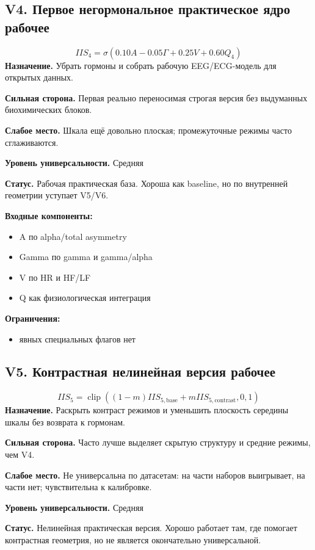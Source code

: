 \documentclass[11pt,a4paper]{article}
\begin{document}
\subsection*{V4. Первое негормональное практическое ядро \textcolor{green!20!black}{\textbf{рабочее}}}
\[
IIS_4=\sigma(0.10A-0.05\Gamma+0.25V+0.60Q_4)
\]
\textbf{Назначение.} Убрать гормоны и собрать рабочую EEG/ECG-модель для открытых данных.

\textbf{Сильная сторона.} Первая реально переносимая строгая версия без выдуманных биохимических блоков.

\textbf{Слабое место.} Шкала ещё довольно плоская; промежуточные режимы часто сглаживаются.

\textbf{Уровень универсальности.} Средняя

\textbf{Статус.} Рабочая практическая база. Хороша как baseline, но по внутренней геометрии уступает V5/V6.

\textbf{Входные компоненты:}
\begin{itemize}[leftmargin=1.2cm]
\item A по alpha/total asymmetry
\item Gamma по gamma и gamma/alpha
\item V по HR и HF/LF
\item Q как физиологическая интеграция
\end{itemize}

\textbf{Ограничения:}
\begin{itemize}[leftmargin=1.2cm]
\item явных специальных флагов нет
\end{itemize}


\subsection*{V5. Контрастная нелинейная версия \textcolor{green!20!black}{\textbf{рабочее}}}
\[
IIS_5=\operatorname{clip}\!\left((1-m)IIS_{5,\mathrm{base}}+mIIS_{5,\mathrm{contrast}},0,1\right)
\]
\textbf{Назначение.} Раскрыть контраст режимов и уменьшить плоскость середины шкалы без возврата к гормонам.

\textbf{Сильная сторона.} Часто лучше выделяет скрытую структуру и средние режимы, чем V4.

\textbf{Слабое место.} Не универсальна по датасетам: на части наборов выигрывает, на части нет; чувствительна к калибровке.

\textbf{Уровень универсальности.} Средняя

\textbf{Статус.} Нелинейная практическая версия. Хорошо работает там, где помогает контрастная геометрия, но не является окончательно универсальной.
\end{document}
